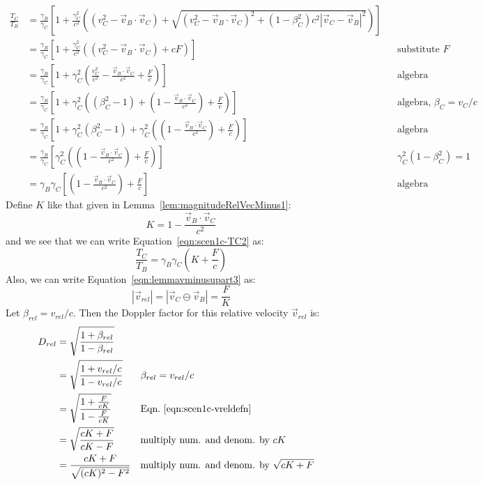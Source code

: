 \documentclass[a4paper]{article}
\theoremstyle{plain}
\theoremstyle{definition}
\newcommand{\vect}[1]{\vec{#1}}
\begin{document}
\begin{align}
\frac{T_C}{T_B}
  & = \frac{\gamma_B}{\gamma_C} \left[ 1 + \frac{\gamma_C^2}{c^2} \left( (v_C^2 - \vect{v}_B \cdot \vect{v}_C) + \sqrt{(v_C^2 - \vect{v}_B \cdot \vect{v}_C)^2  + (1-\beta_C^2)c^2 |\vect{v}_C - \vect{v}_B|^2} \right) \right] \nonumber \\
  & = \frac{\gamma_B}{\gamma_C} \left[ 1 + \frac{\gamma_C^2}{c^2} \left( (v_C^2 - \vect{v}_B \cdot \vect{v}_C) + cF \right) \right] & & \text{substitute $F$} \nonumber \\
  & = \frac{\gamma_B}{\gamma_C} \left[ 1 + \gamma_C^2 \left( \frac{v_C^2}{c^2} - \frac{\vect{v}_B \cdot \vect{v}_C}{c^2} + \frac{F}{c} \right) \right] & & \text{algebra} \nonumber \\
  & = \frac{\gamma_B}{\gamma_C} \left[ 1 + \gamma_C^2 \left( (\beta_C^2 - 1) + (1 - \frac{\vect{v}_B \cdot \vect{v}_C}{c^2}) + \frac{F}{c} \right) \right] & & \text{algebra, $\beta_C=v_C/c$} \nonumber \\
  & = \frac{\gamma_B}{\gamma_C} \left[ 1 + \gamma_C^2 (\beta_C^2 - 1) + \gamma_C^2 \left( (1 - \frac{\vect{v}_B \cdot \vect{v}_C}{c^2}) + \frac{F}{c} \right) \right] & & \text{algebra} \nonumber \\
  & = \frac{\gamma_B}{\gamma_C} \left[ \gamma_C^2 \left( (1 - \frac{\vect{v}_B \cdot \vect{v}_C}{c^2}) + \frac{F}{c} \right) \right] & & \text{$\gamma_C^2 (1-\beta_C^2) = 1$} \nonumber \\
  & = \gamma_B \gamma_C \left[ (1 - \frac{\vect{v}_B \cdot \vect{v}_C}{c^2}) + \frac{F}{c} \right] & & \text{algebra} \label{eqn:scen1c-TC2}
\end{align}
Define $K$ like that given in Lemma~\ref{lem:magnitudeRelVecMinus1}:
\begin{equation}
K = 1 - \frac{\vect{v}_B \cdot \vect{v}_C}{c^2} \nonumber
\end{equation}
and we see that we can write Equation~\eqref{eqn:scen1c-TC2} as:
\begin{equation}
\frac{T_C}{T_B}
  = \gamma_B \gamma_C \left( K + \frac{F}{c} \right) \label{eqn:scen1c-TC3}
\end{equation}
Also, we can write Equation~\eqref{eqn:lemmavminusupart3} as:
\begin{equation}
|\vect{v}_{rel}| = |\vect{v}_C \ominus \vect{v}_B| = \frac{F}{K} \label{eqn:scen1c-vreldefn}
\end{equation}
Let $\beta_{rel} = v_{rel}/c$.  Then the Doppler factor for this
relative velocity $\vect{v}_{rel}$ is:
\begin{align}
D_{rel}
  & = \sqrt{ \frac{1+\beta_{rel}}{1-\beta_{rel}} } \nonumber \\
  & = \sqrt{ \frac{1+v_{rel}/c}{1-v_{rel}/c} } & & \text{$\beta_{rel}=v_{rel}/c$} \nonumber \\
  & = \sqrt{ \frac{1+\frac{F}{cK}}{1-\frac{F}{cK}} } & & \text{Eqn.~\eqref{eqn:scen1c-vreldefn}} \nonumber \\
  & = \sqrt{ \frac{cK+F}{cK-F} } & & \text{multiply num. and denom. by $cK$} \nonumber \\
  & = \frac{cK+F}{\sqrt{ (cK)^2 - F^2 }} & & \text{multiply num. and denom. by $\sqrt{cK+F}$} \label{scen1c:dopplerfactor1}
\end{align}
\end{document}
